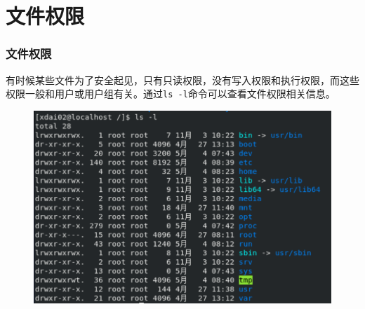 \documentclass[12pt, openany, oneside]{book}
\begin{document}
\begin{table}[H]
    \centering
    \caption{\lstinline|userdel|参数说明}
\end{table}

\newpage

\section{文件权限}

\subsubsection{文件权限}

有时候某些文件为了安全起见，只有只读权限，没有写入权限和执行权限，而这些权限一般和用户或用户组有关。通过\lstinline|ls -l|命令可以查看文件权限相关信息。

\begin{figure}[H]
    \centering
    \includegraphics[scale=0.7]{img/C5/5-2/1.png}
\end{figure}
\end{document}
